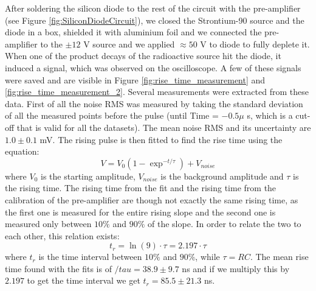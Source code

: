 \documentclass[12pt]{article}
\begin{document}
After soldering the silicon diode to the rest of the circuit with the pre-amplifier (see Figure \ref{fig:SiliconDiodeCircuit}), we closed the Strontium-90 source and the diode in a box, shielded it with aluminium foil and we connected the pre-amplifier to the $\pm 12$ V source and we applied $\approx 50$ V to diode to fully deplete it. When one of the product decays of the radioactive source hit the diode, it induced a signal, which was observed on the oscilloscope. A few of these signals were saved and are visible in Figure \ref{fig:rise_time_measurement} and \ref{fig:rise_time_measurement_2}. Several measurements were extracted from these data. First of all the noise RMS was measured by taking the standard deviation of all the measured points before the pulse (until Time = $-0.5\mu$ s, which is a cut-off that is valid for all the datasets). The mean noise RMS and its uncertainty are $1.0 \pm 0.1$ mV.
The rising pulse is then fitted to find the rise time using the equation:
\begin{equation}
  V = V_{0} (1 - \exp^{-t/\tau}) + V_{noise}
\end{equation}
where $V_{0}$ is the starting amplitude, $V_{noise}$ is the background amplitude and $\tau$ is the rising time. The rising time from the fit and the rising time from the calibration of the pre-amplifier are though not exactly the same rising time, as the first one is measured for the entire rising slope and the second one is measured only between $10\%$ and $90\%$ of the slope. In order to relate the two to each other, this relation exists:
\begin{equation}
t_{r} = \ln(9) \cdot \tau = 2.197 \cdot \tau
\end{equation}
where $t_{r}$ is the time interval between $10\%$ and $90\%$, while $\tau = RC$. 
The mean rise time found with the fits is of $/tau = 38.9 \pm 9.7$ ns and if we multiply this by $2.197$ to get the time interval we get $t_{r} = 85.5 \pm 21.3$ ns.
\end{document}
